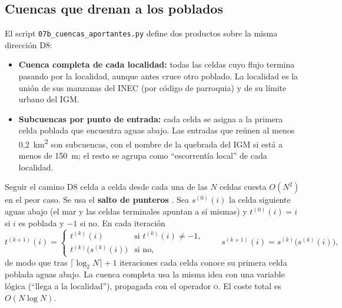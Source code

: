 \documentclass{sosg-informe}
\newcommand{\kmc}{km\textsuperscript{2}}
\begin{document}
\subsection{Cuencas que drenan a los poblados}\label{sec:cuencas-met}
El script \texttt{07b\_cuencas\_aportantes.py} define dos productos sobre la misma dirección D8:
\begin{itemize}
  \item \textbf{Cuenca completa de cada localidad:} todas las celdas cuyo flujo termina pasando por la localidad, aunque antes cruce otro poblado. La localidad es la unión de sus manzanas del INEC (por código de parroquia) y de su límite urbano del IGM.
  \item \textbf{Subcuencas por punto de entrada:} cada celda se asigna a la primera celda poblada que encuentra aguas abajo. Las entradas que reúnen al menos 0,2~\kmc{} son subcuencas, con el nombre de la quebrada del IGM si está a menos de 150~m; el resto se agrupa como \enquote{escorrentía local} de cada localidad.
\end{itemize}
Seguir el camino D8 celda a celda desde cada una de las $N$ celdas cuesta $O(N^2)$ en el peor caso. Se usa el \textbf{salto de punteros} \citep{hillis1986}. Sea $s^{(0)}(i)$ la celda siguiente aguas abajo (el mar y las celdas terminales apuntan a sí mismas) y $t^{(0)}(i) = i$ si $i$ es poblada y $-1$ si no. En cada iteración
\begin{equation}
  t^{(k+1)}(i) = \begin{cases} t^{(k)}(i) & \text{si } t^{(k)}(i) \neq -1,\\ t^{(k)}\bigl(s^{(k)}(i)\bigr) & \text{si no,}\end{cases}
  \qquad s^{(k+1)}(i) = s^{(k)}\bigl(s^{(k)}(i)\bigr),
\end{equation}
de modo que tras $\lceil \log_2 N \rceil + 1$ iteraciones cada celda conoce su primera celda poblada aguas abajo. La cuenca completa usa la misma idea con una variable lógica (\enquote{llega a la localidad}), propagada con el operador \textsc{o}. El coste total es $O(N \log N)$.
\end{document}
